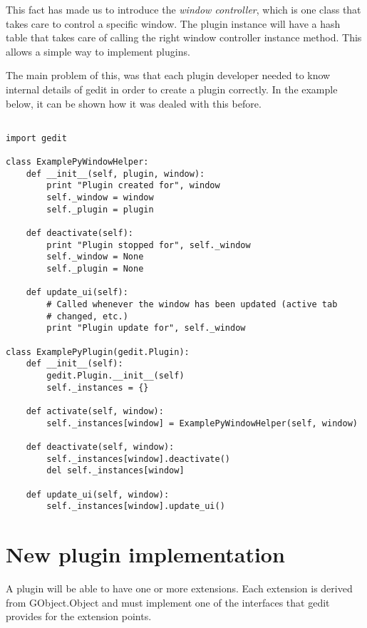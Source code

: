 This fact has made us to introduce the \emph{window controller}, which is one class that takes care to control a specific window. The plugin instance will have a hash table that takes care of calling the right window controller instance method. This allows a simple way to implement plugins.

The main problem of this, was that each plugin developer needed to know internal details of gedit in order to create a plugin correctly. In the example below, it can be shown how it was dealed with this before.

\begin{lstlisting}[style=python]

import gedit

class ExamplePyWindowHelper:
    def __init__(self, plugin, window):
        print "Plugin created for", window
        self._window = window
        self._plugin = plugin

    def deactivate(self):
        print "Plugin stopped for", self._window
        self._window = None
        self._plugin = None

    def update_ui(self):
        # Called whenever the window has been updated (active tab
        # changed, etc.)
        print "Plugin update for", self._window

class ExamplePyPlugin(gedit.Plugin):
    def __init__(self):
        gedit.Plugin.__init__(self)
        self._instances = {}

    def activate(self, window):
        self._instances[window] = ExamplePyWindowHelper(self, window)

    def deactivate(self, window):
        self._instances[window].deactivate()
        del self._instances[window]

    def update_ui(self, window):
        self._instances[window].update_ui()

\end{lstlisting}

\section{New plugin implementation}

A plugin will be able to have one or more extensions. Each extension is derived from GObject.Object and must implement one of the interfaces that gedit provides for the extension points.

